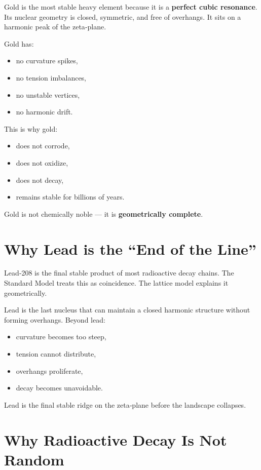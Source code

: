 \documentclass[11pt, letterpaper, openany]{book}
\begin{document}
Gold is the most stable heavy element because it is a \textbf{perfect cubic resonance}. Its
nuclear geometry is closed, symmetric, and free of overhangs. It sits on a harmonic peak
of the zeta‑plane.

Gold has:

\begin{itemize}
    \item no curvature spikes,
    \item no tension imbalances,
    \item no unstable vertices,
    \item no harmonic drift.
\end{itemize}

This is why gold:

\begin{itemize}
    \item does not corrode,
    \item does not oxidize,
    \item does not decay,
    \item remains stable for billions of years.
\end{itemize}

Gold is not chemically noble — it is \textbf{geometrically complete}.

\section{Why Lead is the ``End of the Line''}

Lead‑208 is the final stable product of most radioactive decay chains. The Standard Model
treats this as coincidence. The lattice model explains it geometrically.

Lead is the last nucleus that can maintain a closed harmonic structure without forming
overhangs. Beyond lead:

\begin{itemize}
    \item curvature becomes too steep,
    \item tension cannot distribute,
    \item overhangs proliferate,
    \item decay becomes unavoidable.
\end{itemize}

Lead is the final stable ridge on the zeta‑plane before the landscape collapses.

\section{Why Radioactive Decay Is Not Random}
\end{document}
